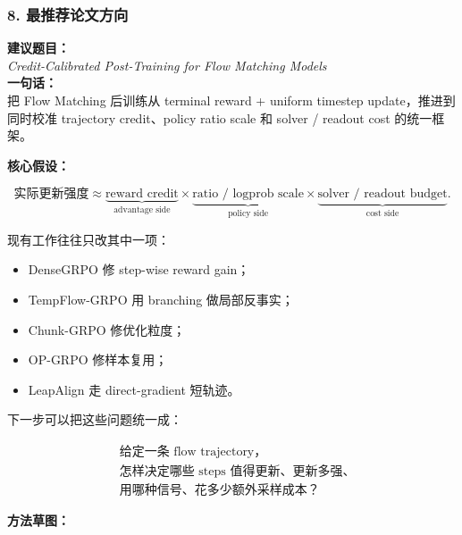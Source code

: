 \subsubsection*{8. 最推荐论文方向}

\begin{summarybox}
\textbf{建议题目：}\\
\textit{Credit-Calibrated Post-Training for Flow Matching Models}\\
\textbf{一句话：}\\
把 Flow Matching 后训练从 terminal reward + uniform timestep update，推进到同时校准 trajectory credit、policy ratio scale 和 solver / readout cost 的统一框架。
\end{summarybox}

\textbf{核心假设：}

\[
\text{实际更新强度}
\approx
\underbrace{\text{reward credit}}_{\text{advantage side}}
\times
\underbrace{\text{ratio / logprob scale}}_{\text{policy side}}
\times
\underbrace{\text{solver / readout budget}}_{\text{cost side}}.
\]

现有工作往往只改其中一项：

\begin{itemize}[leftmargin=1.5em]
  \item DenseGRPO 修 step-wise reward gain；
  \item TempFlow-GRPO 用 branching 做局部反事实；
  \item Chunk-GRPO 修优化粒度；
  \item OP-GRPO 修样本复用；
  \item LeapAlign 走 direct-gradient 短轨迹。
\end{itemize}

下一步可以把这些问题统一成：

\[
\begin{aligned}
&\text{给定一条 flow trajectory，}\\
&\text{怎样决定哪些 steps 值得更新、更新多强、}\\
&\text{用哪种信号、花多少额外采样成本？}
\end{aligned}
\]

\textbf{方法草图：}

